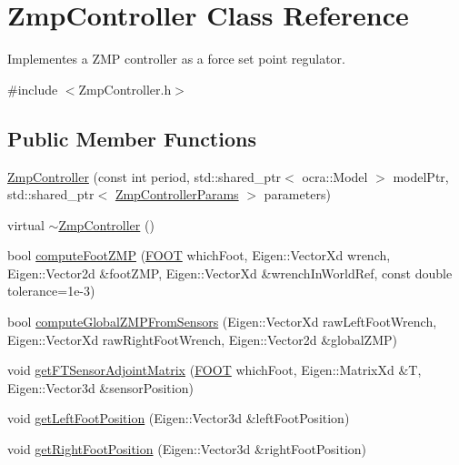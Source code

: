 \hypertarget{classZmpController}{\section{\-Zmp\-Controller \-Class \-Reference}
\label{classZmpController}
}


\-Implementes a \-Z\-M\-P controller as a force set point regulator.  




{\ttfamily \#include $<$\-Zmp\-Controller.\-h$>$}

\subsection*{\-Public \-Member \-Functions}
\begin{DoxyCompactItemize}
\item 
\hyperlink{classZmpController_a4c47608f6d62b6b490808816879c01b7}{\-Zmp\-Controller} (const int period, std\-::shared\-\_\-ptr$<$ ocra\-::\-Model $>$ model\-Ptr, std\-::shared\-\_\-ptr$<$ \hyperlink{structZmpControllerParams}{\-Zmp\-Controller\-Params} $>$ parameters)
\item 
virtual \hyperlink{classZmpController_af308a70e70cfe9a1e9569606da8b1739}{$\sim$\-Zmp\-Controller} ()
\item 
bool \hyperlink{classZmpController_a6fd41771d83a31bd190f4031f82649e0}{compute\-Foot\-Z\-M\-P} (\hyperlink{ZmpController_8h_a4b6a8e135f90bd56e5a57a60efb42529}{\-F\-O\-O\-T} which\-Foot, \-Eigen\-::\-Vector\-Xd wrench, \-Eigen\-::\-Vector2d \&foot\-Z\-M\-P, \-Eigen\-::\-Vector\-Xd \&wrench\-In\-World\-Ref, const double tolerance=1e-\/3)
\item 
bool \hyperlink{classZmpController_aae5cc381a922206dad10ba2d425992ce}{compute\-Global\-Z\-M\-P\-From\-Sensors} (\-Eigen\-::\-Vector\-Xd raw\-Left\-Foot\-Wrench, \-Eigen\-::\-Vector\-Xd raw\-Right\-Foot\-Wrench, \-Eigen\-::\-Vector2d \&global\-Z\-M\-P)
\item 
void \hyperlink{classZmpController_aad272bd33de6fad489ea99618a7e9afa}{get\-F\-T\-Sensor\-Adjoint\-Matrix} (\hyperlink{ZmpController_8h_a4b6a8e135f90bd56e5a57a60efb42529}{\-F\-O\-O\-T} which\-Foot, \-Eigen\-::\-Matrix\-Xd \&\-T, \-Eigen\-::\-Vector3d \&sensor\-Position)
\item 
void \hyperlink{classZmpController_ac8e821f72c79fe86102f02c4c155ad30}{get\-Left\-Foot\-Position} (\-Eigen\-::\-Vector3d \&left\-Foot\-Position)
\item 
void \hyperlink{classZmpController_a815cd495f657cbd93c25610d24982e8c}{get\-Right\-Foot\-Position} (\-Eigen\-::\-Vector3d \&right\-Foot\-Position)

\end{DoxyCompactItemize}
